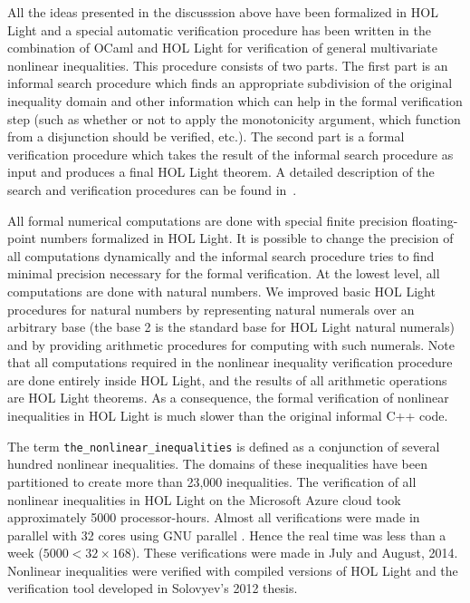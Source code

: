 All the ideas presented in the discusssion above have been
formalized in HOL Light and a special automatic verification procedure
has been written in the combination of OCaml and HOL Light for
verification of general multivariate nonlinear inequalities. This
procedure consists of two parts. The first part is an informal search
procedure which finds an appropriate subdivision of the original
inequality domain and other information which can help in the formal
verification step (such as whether or not to apply the monotonicity
argument, which function from a disjunction should be verified,
etc.). The second part is a formal verification procedure which takes
the result of the informal search procedure as input and produces a
final HOL Light theorem. A detailed description of the search and
verification procedures can be found
in~\cite{Solovyev-thesis,Solovyev:NFM2013}.

All formal numerical computations are done with special finite
precision floating-point numbers formalized in HOL Light. It is
possible to change the precision of all computations dynamically and
the informal search procedure tries to find minimal precision
necessary for the formal verification. At the lowest level, all
computations are done with natural numbers. We improved basic HOL
Light procedures for natural numbers by representing natural numerals
over an arbitrary base (the base 2 is the standard base for HOL Light
natural numerals) and by providing arithmetic procedures for computing
with such numerals. Note that all computations required in the
nonlinear inequality verification procedure are done entirely inside
HOL Light, and the results of all arithmetic operations are HOL Light
theorems. As a consequence, the formal verification of nonlinear
inequalities in HOL Light is much slower than the original informal
C++ code.

The term \verb!the_nonlinear_inequalities! is defined as a conjunction
of several hundred nonlinear inequalities. The domains of these
inequalities have been partitioned to create more than 23,000
inequalities. The verification of all nonlinear inequalities in HOL
Light on the Microsoft Azure cloud took approximately 5000
processor-hours. Almost all verifications were made in parallel with
32 cores using GNU parallel \cite{Tange2011a}.  Hence the real time
was less than a week ($5000 < 32\times 168$). These verifications
were made in July and August, 2014.  Nonlinear inequalities
were verified with compiled versions of HOL Light and the verification
tool developed in Solovyev's 2012 thesis.

